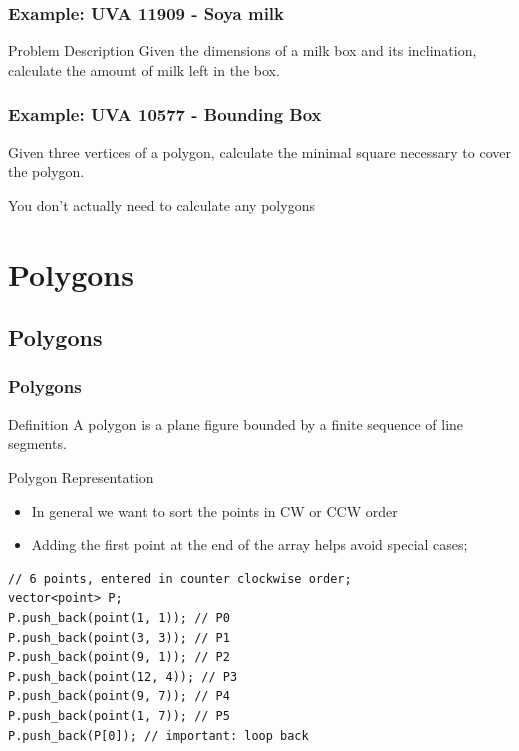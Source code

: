 \documentclass{beamer}
\begin{document}
\begin{frame}
  \frametitle{Example: UVA 11909 - Soya milk}
  \begin{block}{Problem Description}
    Given the dimensions of a milk box and its inclination, calculate
    the amount of milk left in the box.
  \end{block}
\end{frame}

\begin{frame}
  \frametitle{Example: UVA 10577 - Bounding Box}
  \begin{block}{}
    Given three vertices of a  polygon,
    calculate the minimal square necessary to cover the polygon.
  \end{block}


  \bigskip
  
  {\smaller

     You don't actually need to calculate any polygons
  }
\end{frame}

\section{Polygons}
\subsection{Polygons}
\begin{frame}
  \frametitle{Polygons}
  {\smaller    
  \begin{block}{Definition}
    A polygon is a plane figure bounded by a finite sequence of line
    segments.
  \end{block}

  \begin{exampleblock}{Polygon Representation}
    \begin{itemize}
    \item In general we want to sort the points in CW or CCW order
    \item Adding the first point at the end of the array helps avoid
      special cases;
    \end{itemize}
\begin{verbatim}
// 6 points, entered in counter clockwise order;
vector<point> P;
P.push_back(point(1, 1)); // P0
P.push_back(point(3, 3)); // P1
P.push_back(point(9, 1)); // P2
P.push_back(point(12, 4)); // P3
P.push_back(point(9, 7)); // P4
P.push_back(point(1, 7)); // P5
P.push_back(P[0]); // important: loop back
\end{verbatim}
\end{exampleblock}
  }

\end{frame}
\end{document}

